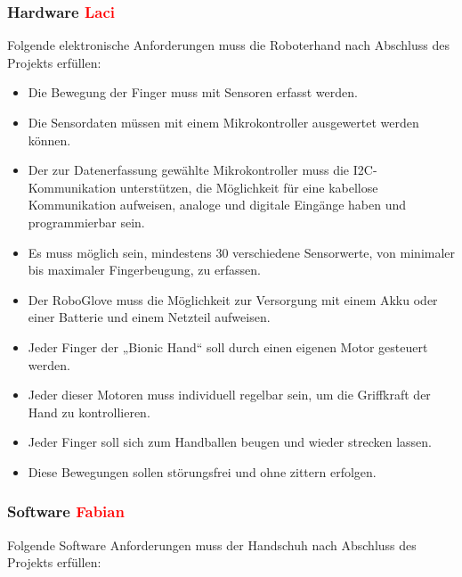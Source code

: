 \documentclass[11pt]{article}
\begin{document}
\subsubsection{Hardware \textcolor{red}{Laci}}

Folgende elektronische Anforderungen muss die Roboterhand nach Abschluss des Projekts erfüllen:

	\begin{itemize}
		\item Die Bewegung der Finger muss mit Sensoren erfasst werden.
		\item Die Sensordaten müssen mit einem Mikrokontroller ausgewertet werden können.
		\item Der zur Datenerfassung gewählte Mikrokontroller muss die I2C-Kommunikation unterstützen, die Möglichkeit
			  für eine kabellose Kommunikation aufweisen, analoge und digitale Eingänge haben und programmierbar sein. 
		\item Es muss möglich sein, mindestens 30 verschiedene Sensorwerte, von minimaler bis maximaler Fingerbeugung, 
		      zu erfassen.
		\item Der RoboGlove muss die Möglichkeit zur Versorgung mit einem Akku oder einer Batterie und einem Netzteil 
		      aufweisen. 
		\item Jeder Finger der „Bionic Hand“ soll durch einen eigenen Motor gesteuert werden.
		\item Jeder dieser Motoren muss individuell regelbar sein, um die Griffkraft der Hand zu kontrollieren.	
		\item Jeder Finger soll sich zum Handballen beugen und wieder strecken lassen.	
		\item Diese Bewegungen sollen störungsfrei und ohne zittern erfolgen.
	\end{itemize}

\subsubsection{Software \textcolor{red}{Fabian}}

	Folgende Software Anforderungen muss der Handschuh nach Abschluss des Projekts erfüllen:
\end{document}
